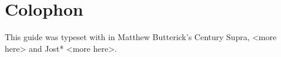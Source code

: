\setlength\parskip{0.55\baselineskip}
\setlength\parindent{0pt}

\backmatter

\chapter{Colophon}

This guide was typeset with \LuaLaTeX{} in Matthew Butterick's
Century Supra,
<more here> and \sffamily Jost* <more here>.

